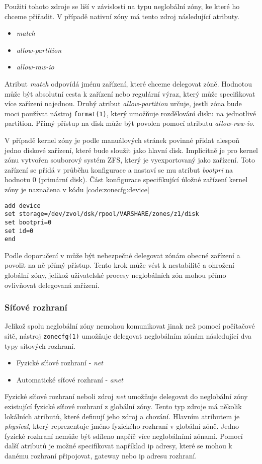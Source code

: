 Použití tohoto zdroje se liší v závislosti na typu neglobální zóny, ke které ho chceme přiřadit. V případě nativní zóny má tento
zdroj následující  atributy.
\begin{itemize}
 \item \textit{match}
 \item \textit{allow-partition}
 \item \textit{allow-raw-io}
\end{itemize}
Atribut \textit{match} odpovídá jménu zařízení, které chceme delegovat zóně. Hodnotou může být absolutní cesta k zařízení nebo
regulární výraz, který může specifikovat více zařízení najednou. Druhý atribut \textit{allow-partition} určuje, jestli zóna 
bude moci používat nástroj \verb|format(1)|, který umožňuje rozdělování disku na jednotlivé partition. Přímý přístup na disk může
být povolen pomocí atributu \textit{allow-raw-io}.

V případě kernel zóny je podle manuálových stránek \cite{oracle:manpages:solaris-kz} povinné přidat alespoň jedno diskové zařízení,
které bude sloužit jako hlavní disk. Implicitně je pro kernel zónu vytvořen souborový systém ZFS, který je vyexportovaný jako
zařízení. Toto zařízení se přidá v průběhu konfigurace a nastaví se mu atribut \textit{bootpri} na hodnotu 0 (primární disk).
Část konfigurace specifikující úložné zařízení kernel zóny je naznačena v kódu \ref{code:zonecfg:device}
\begin{lstlisting}[caption={Konfigurace zařízení kernel zóny}, float, label={code:zonecfg:device}]
add device
set storage=/dev/zvol/dsk/rpool/VARSHARE/zones/z1/disk
set bootpri=0
set id=0
end
\end{lstlisting}
Podle doporučení v \cite{oracle:manpages:zonecfg} může být nebezpečné delegovat zónám obecné zařízení a povolit na ně přímý
přístup. Tento krok může vést k nestabilitě a ohrožení globální zóny, jelikož uživatelské procesy neglobálních zón mohou
přímo ovlivňovat delegovaná zařízení.
\subsubsection{Síťové rozhraní}
\label{chapter:zones:configuration:resources:network}
Jelikož spolu neglobální zóny nemohou komunikovat jinak než pomocí počítačové sítě, nástroj \verb|zonecfg(1)| umožňuje delegovat
neglobálním zónám následující dva typy sítových rozhraní. 
\begin{itemize}
 \item Fyzické síťové rozhraní - \textit{net}
 \item Automatické síťové rozhraní - \textit{anet}
\end{itemize}
Fyzické síťové rozhraní neboli zdroj \textit{net} umožňuje delegovat do neglobální zóny existující fyzické síťové rozhraní
z globální zóny. Tento typ zdroje má několik lokálních atributů, které definují jeho zdroj a chování. Hlavním atributem je
\textit{physical}, který reprezentuje jméno fyzického rozhraní v globální zóně. Jedno fyzické rozhraní nemůže být sdíleno
napříč více neglobálními zónami. Pomocí další atributů je možné specifikovat například ip adresy, které se mohou k danému 
rozhraní připojovat, gateway nebo ip adresu rozhraní. 

